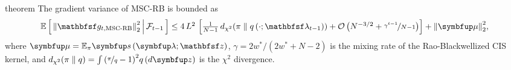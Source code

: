 \begin{theoremEnd}{theorem}{\citep{cardoso_brsnis_2022}}\label{thm:mscrb}
  The gradient variance of MSC-RB is bounded as
  {%
  \begin{align*}
  {\textstyle
    \E{ {\lVert \rvvg_{t,\mathrm{MSC\text{-}RB}} \rVert}_2^2  \,\middle|\, \mathcal{F}_{t-1} }
    \leq
    4 \, L^2 \,\left[
    \frac{1}{N-1}\,\DChi{\pi}{q\left(\cdot; \rvvlambda_{t-1}\right)} 
    +
    \mathcal{O}\left(N^{-3/2} + \nicefrac{\gamma^{t-1}}{N-1}\right)
    \right]
    +
    {\lVert\vmu\rVert}^2_2,
  }
  \end{align*}
  }%
  where \(\vmu = \mathbb{E}_{\pi}\vs\left(\vlambda;\rvvz\right)\), \(\gamma = 2 w^* / \left(2 w^* + N - 2\right)\) is the mixing rate of the Rao-Blackwellized CIS kernel, and {\small\(
  \DChi{\pi}{q} = \int {\left(\nicefrac{\pi}{q} - 1\right)}^2 q\left(d\vz\right)
  \)} is the \(\chi^2\) divergence.
\end{theoremEnd}
